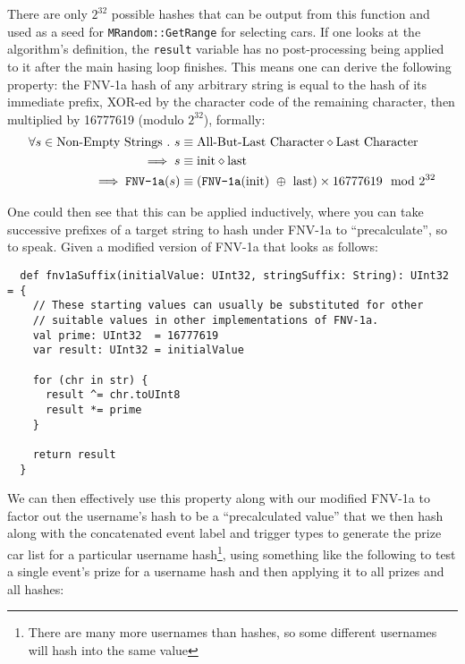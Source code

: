 \documentclass[14pt,a4paper,notitlepage]{extarticle}
\begin{document}
                There are only $2^{32}$ possible hashes that can be output from this function and
                used as a seed for \texttt{MRandom::GetRange} for selecting cars. If one
                looks at the algorithm's definition, the \texttt{result} variable has no
                post-processing being applied to it after the main hasing loop finishes.
                This means one can derive the following property: the FNV-1a hash of any arbitrary
                string is equal to the hash of its immediate prefix, XOR-ed by the character code
                of the remaining character, then multiplied by 16777619 (modulo $2^{32}$), formally:
                \begin{align*}
                    \forall s \in \text{Non-Empty Strings}\ .\ s &\equiv \text{All-But-Last Character} \diamond \text{Last Character}\\
                    \implies s &\equiv \text{init} \diamond \text{last}\\
                    \implies \text{\texttt{FNV-1a}}(s) &\equiv (\text{\texttt{FNV-1a}}(\text{init})\ \oplus\ \text{last}) \times 16777619 \mod 2^{32}
                \end{align*}

                One could then see that this can be applied inductively, where you can take successive
                prefixes of a target string to hash under FNV-1a to ``precalculate'', so to speak.
                Given a modified version of FNV-1a that looks as follows:

                \begin{lstlisting}
  def fnv1aSuffix(initialValue: UInt32, stringSuffix: String): UInt32 = {
    // These starting values can usually be substituted for other
    // suitable values in other implementations of FNV-1a.
    val prime: UInt32  = 16777619
    var result: UInt32 = initialValue

    for (chr in str) {
      result ^= chr.toUInt8
      result *= prime
    }

    return result
  }
                \end{lstlisting}

                We can then effectively use this property along with our modified FNV-1a to factor out
                the username's hash to be a ``precalculated value'' that we then hash along with the
                concatenated event label and trigger types to generate the prize car list for a
                particular username hash\footnote{There are many more usernames than hashes, so some
                different usernames will hash into the same value}, using something like the
                following to test a single event's prize for a username hash and then applying it to
                all prizes and all hashes:
\end{document}
